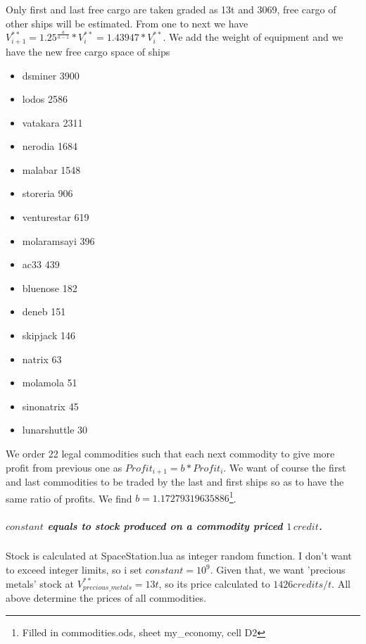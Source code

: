 \documentclass[]{article}
\begin{document}
Only first and last free cargo are taken graded as 13t and 3069, free cargo of other ships will be estimated. From one to next we have $V^{**}_{i+1}=1.25^{\tfrac{a}{a-1}}*V^{**}_{i}=1.43947*V^{**}_{i}$. We add the weight of equipment and we have the new free cargo space of ships
\begin{itemize}
	\item dsminer	3900
\item 	lodos	2586
	
\item 	vatakara	2311
\item 	nerodia	1684
	
\item 	malabar	1548
\item 	storeria	906
\item 	venturestar	619
	
\item 	molaramsayi	396
\item 	ac33	439
	
\item 	bluenose	182
\item 	deneb	151
\item 	skipjack	146
	
\item 	natrix	63
	
\item 	molamola	51
\item 	sinonatrix	45
\item 	lunarshuttle	30	
\end{itemize}
We order 22 legal commodities such that each next commodity to give more profit from previous one as $Profit_{i+1}=b*Profit_{i}$. We want of course the first and last commodities to be traded by the last and first ships so as to have the same ratio of profits.  We find $b=1.17279319635886$\footnote{Filled in commodities.ods, sheet my\_economy, cell D2}.
\subparagraph{$constant$ equals to stock produced on a commodity priced $1\,credit$.} Stock is calculated at SpaceStation.lua as integer random function. I don't want to exceed integer limits, so i set $constant=10^9$. Given that, we want 'precious metals' stock at $V^{**}_{precious\_metals}=13t$, so its price calculated to $1426 credits/t$. All above determine the prices of all commodities.
\end{document}
